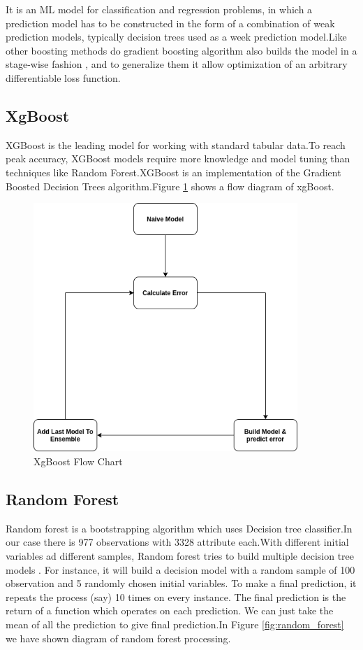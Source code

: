It is an ML model for classification and regression problems, in which a prediction model has to be constructed in the form of a combination of weak prediction models, typically decision trees used as a week prediction model.Like other boosting methods do gradient boosting algorithm also builds the model in a stage-wise fashion , and to generalize them it allow optimization of an arbitrary differentiable loss function.


\subsection{XgBoost}
XGBoost is the leading model for working with standard tabular data.To reach peak accuracy, XGBoost models require more knowledge and model tuning than techniques like Random Forest.XGBoost is an implementation of the Gradient Boosted Decision Trees algorithm.Figure \ref{fig:xg_boost} shows a flow diagram of xgBoost.
\begin{figure}
    \centering
    \includegraphics[width=10cm]{Pictures/xgboost.png}
    \caption{XgBoost Flow Chart}
    \label{fig:xg_boost}
\end{figure}

\subsection{Random Forest}
Random forest is a bootstrapping algorithm which uses Decision tree classifier.In our case there is 977 observations with 3328 attribute each.With different initial variables ad different samples, Random forest tries to build multiple decision tree models . For instance, it will build a decision model with a random sample of 100 observation and 5 randomly chosen initial variables. To  make a final prediction, it repeats the process (say) 10 times on every instance. The final prediction is the return of a function which operates on each prediction. We can just take the mean of all the prediction to give final prediction.In Figure \ref{fig:random_forest} we have shown diagram of random forest processing.


